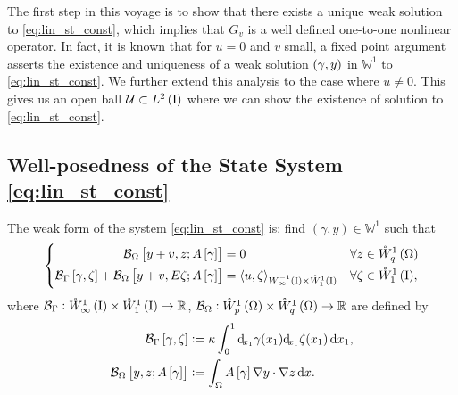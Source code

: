 \documentclass[final]{siamltex}
\begin{document}
The first step in this voyage is to show that there exists a  unique weak solution to \eqref{eq:lin_st_const}, which implies that $G_v$ is a well defined one-to-one nonlinear operator. 
In fact, it is known \cite{PSaavedra_RScott_1991} 
that for $u=0$ and $v$ small, a fixed point argument asserts the existence and uniqueness of a weak solution 
$\del{\gamma,y}$ in ${\mathbb{W}}^1$ to \eqref{eq:lin_st_const}. We further extend this analysis to the case where $u \neq 0$. This gives us an 
open ball ${\mathcal{U}} \subset {{L^2\del{{\text{\rm I}}}}}$ where we can show the existence of solution to  \eqref{eq:lin_st_const}.

\subsection{Well-posedness of the State System \eqref{eq:lin_st_const}}
\label{s:g_well_posed}
The weak form of the system \eqref{eq:lin_st_const} is: 
find $(\gamma,y) \in {\mathbb{W}}^1$ such that
	\begin{equation}\left\{\begin{aligned}\label{eq:g_var_pde} 
		{{\mathcal{B}}_\Omega}\sbr{y+v,z;A\sbr{\gamma}} &= 0  && \forall z \in	{{\mathring{W}^{{1}}_{{q}}\del{{\Omega}}}} \\ 
		{{\mathcal{B}}_\Gamma}\sbr{\gamma,\zeta} + {{\mathcal{B}}_\Omega}\sbr{y+v,E\zeta;A\sbr{\gamma}} &= 
		{{\mathop{{\left\langle {{u,\zeta}} \right\rangle}}}_{{{W^{{-{1}}}_{{{\infty}}}\del{{{\text{\rm I}}}}}}\times{{\mathring{W}^{{{1}}}_{{{1}}}\del{{{\text{\rm I}}}}}}}} 
			&&	\forall \zeta \in {{\mathring{W}^{{1}}_{{1}}\del{{\text{\rm I}}}}},
	\end{aligned}\right.\end{equation}
where ${{\mathcal{B}}_\Gamma}:{{\mathring{W}^{1}_{\infty}\del{{\text{\rm I}}}}} \times {{\mathring{W}^{1}_{1}\del{{\text{\rm I}}}}} \to {\mathbb{R}}$, ${{\mathcal{B}}_\Omega}:{{\mathring{W}^{1}_{p}\del{\Omega}}}\times{{\mathring{W}^{1}_{q}\del{\Omega}}}\to{\mathbb{R}}$ are defined by 
	\begin{equation}\begin{aligned} \label{eq:bilinear_form}
    		{{\mathcal{B}}_\Gamma}\sbr{\gamma,\zeta} &:= \kappa \int_0^1 {{\operatorname{d}\!}_{x_1}\gamma}(x_1) {{\operatorname{d}\!}_{x_1}\zeta}(x_1) \dif x_1, \\
    		{{\mathcal{B}}_\Omega}\sbr{y,z;A\sbr{\gamma}} &:= \int_\Omega A\sbr{\gamma} {\nabla} y \cdot {\nabla} z \dif x.
	\end{aligned}\end{equation}
\end{document}
